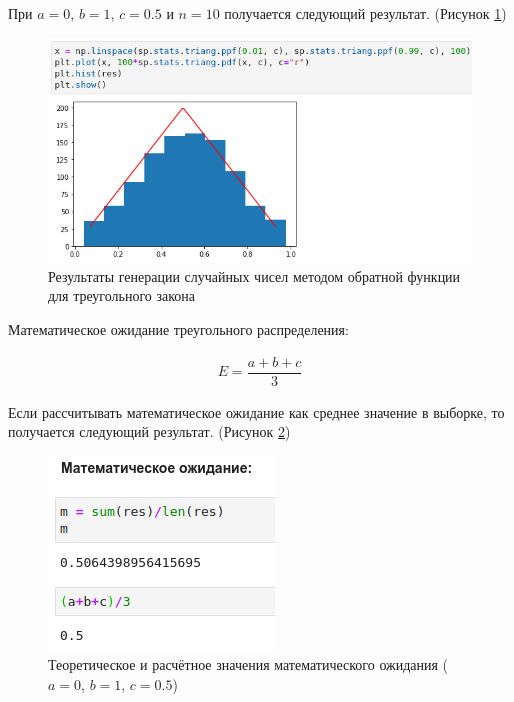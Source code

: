 \documentclass[14pt,fleqn]{extarticle}
\begin{document}
	При $a = 0$, $b = 1$, $c = 0.5$ и $n = 10$ получается следующий результат. (Рисунок \ref{fig:triangle_inverse_function_method_result})
	\begin{figure}[h]
		\centering \includegraphics[scale=0.5]{triangle_inverse_function_method_result}
		\caption{Результаты генерации случайных чисел методом обратной функции для треугольного закона}
		\label{fig:triangle_inverse_function_method_result}
	\end{figure}
	
	Математическое ожидание треугольного распределения:
	\begin{ceqn}
	\begin{align*}
		E = \dfrac{a + b + c}{3}
	\end{align*}
	\end{ceqn}
	\newpage
	Если рассчитывать математическое ожидание как среднее значение в выборке, то получается следующий результат. (Рисунок \ref{fig:triangle_inverse_function_method_math})
	\begin{figure}[h]
		\centering \includegraphics[scale=0.7]{triangle_inverse_function_method_math}
		\caption{Теоретическое и расчётное значения математического ожидания ($a = 0$, $b = 1$, $c = 0.5$)}
		\label{fig:triangle_inverse_function_method_math}
	\end{figure}
	
\end{document}
